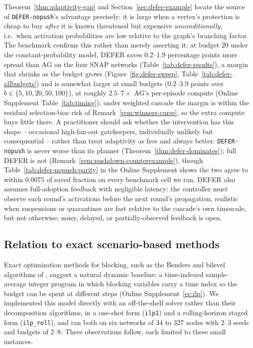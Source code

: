 \documentclass[ijoc,sglanonrev]{informs4}
\begin{document}
Theorem~\ref{thm:adaptivity-gap} and Section~\ref{sec:defer-example}
locate the source of \texttt{DEFER-nopush}'s advantage precisely: it is
large when a vertex's protection is cheap to buy \emph{after} it is known
threatened but expensive \emph{unconditionally}, i.e.\ when activation
probabilities are low relative to the graph's branching factor. The
benchmark confirms this rather than merely asserting it: at budget $20$
under the constant-probability model, DEFER saves $0.2$--$1.9$ percentage
points more spread than AG on the four SNAP networks
(Table~\ref{tab:defer-results}), a margin that shrinks as the budget grows
(Figure~\ref{fig:defer-sweep}, Table~\ref{tab:defer-allbudgets}) and is
somewhat larger at small budgets ($0.2$--$3.9$ points over
$b\in\{5,10,20,50,100\}$), at roughly $2.5$--$7\times$ AG's per-episode
compute (Online Supplement Table~\ref{tab:timing});
under weighted cascade the margin is within the residual selection-bias
risk of Remark~\ref{rem:winners-curse}, so the extra compute buys little
there. A practitioner should ask whether the intervention has this shape
-- occasional high-fan-out gatekeepers, individually unlikely but
consequential -- rather than treat adaptivity as free and always better.
\texttt{DEFER-nopush} is never worse than its planner
(Theorem~\ref{thm:defer-dominates}); full DEFER is not
(Remark~\ref{rem:pushdown-counterexample}), though
Table~\ref{tab:defer-nopush-parity} in the Online Supplement shows the two
agree to within $0.0075$ of saved fraction on every benchmark cell we ran.
DEFER also assumes full-adoption feedback with negligible latency: the
controller must observe each round's activations before the next round's
propagation, realistic when suspensions or quarantines are fast relative
to the cascade's own timescale, but not otherwise; noisy, delayed, or
partially-observed feedback is open.

\subsection{Relation to exact scenario-based methods}\label{sec:discussion-exact}

Exact optimization methods for blocking, such as the Benders and bilevel
algorithms of \citet{taninmis2022,taninmis2024}, suggest a natural dynamic
baseline: a time-indexed sample-average integer program in which blocking
variables carry a time index so the budget can be spent at different steps
(Online Supplement~\ref{ec:ilp}). We implemented this model directly with an
off-the-shelf solver rather than their decomposition algorithms, in a one-shot
form (\texttt{ilp1}) and a rolling-horizon staged form (\texttt{ilp\_roll}),
and ran both on six networks of 34 to 327 nodes with 2--3 seeds and budgets of
2--8. Three observations follow, each limited to these small instances.
\end{document}
